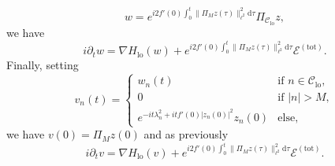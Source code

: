 \documentclass[10pt,a4paper]{amsart}
\theoremstyle{plain}
\theoremstyle{definition}
\DeclareMathOperator{\lo}{lo}
\newcommand{\1}{\mathbf{1}}
\newcommand{\Clo}{\mathscr{C}_{\lo}}
\begin{document}
\[
w = e^{i 2f'(0) \int_0^t \| \Pi_{M} z(\tau) \|_{\ell^2}^2 \mathrm{d}\tau} \Pi_{\Clo} z,
\]
we have
\begin{equation*}
\label{eq:onw}
i\partial_t w = \nabla H_{\lo}(w) + e^{i 2f'(0) \int_0^t \| \Pi_{M} z(\tau) \|_{\ell^2}^2 \mathrm{d}\tau} \mathcal{E}^{\mathrm{(tot)}}.
\end{equation*}
Finally, setting
\begin{equation}
\label{eq:tensorise}
v_n(t) =
\begin{cases}
w_n(t) & \text{if } n\in \Clo, \\
0 &\text{if } |n|>M,\\
e^{-it \lambda_n^2 + i tf'(0) |z_n(0)|^2} z_n(0) & \text{else},
\end{cases}
\end{equation}
we have $v(0) = \Pi_M z(0)$ and as previously
\begin{equation}
\label{eq:onv}
i\partial_t v = \nabla H_{\lo}(v) + e^{i 2f'(0) \int_0^t \| \Pi_{M} z(\tau) \|_{\ell^2}^2 \mathrm{d}\tau} \mathcal{E}^{\mathrm{(tot)}}.
\end{equation}
\end{document}
